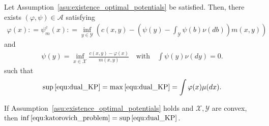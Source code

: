 \documentclass[10pt,a4paper]{amsart}
\begin{document}
\begin{theorem}\label{pro:solution_dual_KP}
 Let Assumption~\ref{asu:existence_optimal_potentials} be satisfied. Then, there exists $(\varphi, \psi)\in \mathcal{A}$ satisfying 
 \begin{align}\label{def:generalized_c_transform}
     \varphi(x) : =   \psi_m^c (x): = \inf_{y \in \mathcal{Y}} \left(c(x,y) - \left( \psi(y) - \int_{\mathcal{Y}} \psi(b) \nu(db) \right) m(x,y) \right)
 \end{align}
 and
 \begin{align}\label{equ:realtion_phi_psi}
        \psi(y) = \inf_{x\in \mathcal{X}} \frac{c(x,y)- \varphi(x)}{m(x,y)} \quad \mbox{with}  \quad \int \psi(y) \nu(dy) = 0.
 \end{align}
 such that
 \begin{align*}
     \sup \eqref{equ:dual_KP} = \max \eqref{equ:dual_KP} = \int \varphi(x)  \mu(dx).
 \end{align*}
\end{theorem}

\begin{theorem}\label{the:strong_duality}
If Assumption~\ref{asu:existence_optimal_potentials} holds and $\mathcal X, \mathcal Y$ are convex, then $\inf \eqref{equ:katorovich_problem} = \sup \eqref{equ:dual_KP}$.
\end{theorem}
\end{document}

